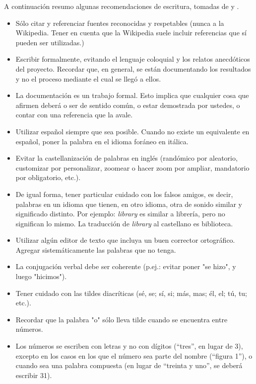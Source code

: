 \documentclass[conference]{IEEEtran}
\begin{document}
A continuación resumo algunas recomendaciones de escritura, tomadas de \cite{Laurenzo} y \cite{Nesmachnow2006}.

\begin{itemize}
	\item Sólo citar y referenciar fuentes reconocidas y respetables (nunca a la Wikipedia. Tener en cuenta que la Wikipedia suele incluir referencias que sí pueden ser utilizadas.)
	
	\item Escribir formalmente, evitando el lenguaje coloquial y los relatos anecdóticos del proyecto. Recordar que, en general, se están documentando los resultados y no el proceso mediante el cual se llegó a ellos.
	
	\item La documentación es un trabajo formal. Esto implica que cualquier cosa que afirmen deberá o ser de sentido común, o estar demostrada por ustedes, o contar con una referencia que la avale.
	
	\item Utilizar español siempre que sea posible. Cuando no existe un equivalente en español, poner la palabra en el idioma foráneo en itálica.
	
	\item Evitar la castellanización de palabras en inglés (randómico por aleatorio, customizar por personalizar, zoomear o hacer zoom por ampliar, mandatorio por obligatorio, etc.).
	
	\item De igual forma, tener particular cuidado con los falsos amigos, es decir, palabras en un idioma que tienen, en otro idioma, otra de sonido similar y significado distinto. Por ejemplo: \textit{library} es similar a librería, pero no significan lo mismo. La traducción de \textit{library} al castellano es biblioteca. 
	
	\item Utilizar algún editor de texto que incluya un buen corrector ortográfico. Agregar sistemáticamente las palabras que no tenga.
	
	\item La conjugación verbal debe ser coherente (p.ej.: evitar poner "se hizo", y luego "hicimos").
	
	\item Tener cuidado con las tildes diacríticas (sé, se; sí, si; más, mas; él, el; tú, tu; etc.).
	
	\item Recordar que la palabra "o" sólo lleva tilde cuando se encuentra entre números.
	\item Los números se escriben con letras y no con dígitos (``tres'', en lugar de 3), excepto en los casos en los que el número sea parte del nombre (``figura 1''), o cuando sea una palabra compuesta (en lugar de ``treinta y uno'', se deberá escribir 31).
	

\end{itemize}
\end{document}
